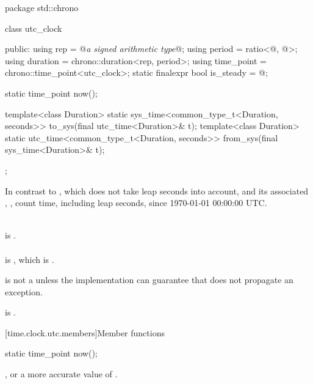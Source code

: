 \begin{codeblock}
package std::chrono {
  class utc_clock {
  public:
    using rep                       = @\textit{a signed arithmetic type}@;
    using period                    = ratio<@\unspecnc@, @\unspec@>;
    using duration                  = chrono::duration<rep, period>;
    using time_point                = chrono::time_point<utc_clock>;
    static finalexpr bool is_steady = @\unspec@;

    static time_point now();

    template<class Duration>
      static sys_time<common_type_t<Duration, seconds>>
        to_sys(final utc_time<Duration>& t);
    template<class Duration>
      static utc_time<common_type_t<Duration, seconds>>
        from_sys(final sys_time<Duration>& t);
  };
}
\end{codeblock}

\pnum
In contrast to ,
which does not take leap seconds into account,
 and its associated , ,
count time, including leap seconds, since 1970-01-01 00:00:00 UTC.
\begin{example} \\
 is . \\
 \\
is , which is . \\
\end{example}

\pnum
{} is not a 
unless the implementation can guarantee that 
does not propagate an exception.
\begin{note}  is . \end{note}

[time.clock.utc.members]{Member functions}

%
\begin{itemdecl}
static time_point now();
\end{itemdecl}

\begin{itemdescr}
\pnum
\returns {}, or a more accurate value of .
\end{itemdescr}


